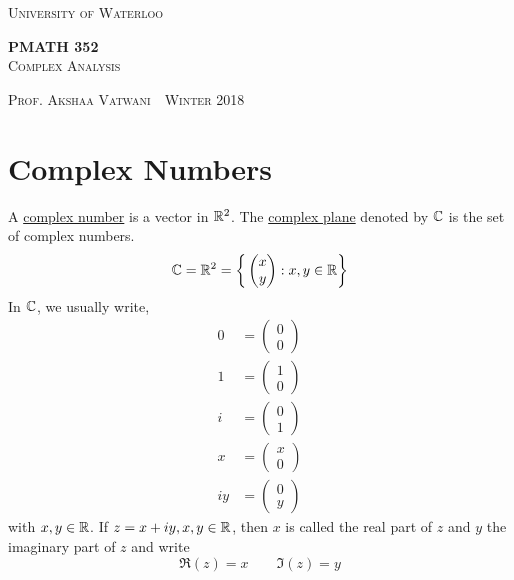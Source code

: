 \documentclass[11pt]{article}
\newcommand{\thiscoursecode}{PMATH 352}
\newcommand{\thiscoursename}{Complex Analysis}
\newcommand{\thisprof}{Prof. Akshaa Vatwani}
\newcommand{\thisterm}{Winter 2018}
\begin{document}
\begin{titlepage}
\begin{centering}
{\scshape\LARGE University of Waterloo \par}
\globe
{\huge\bf \thiscoursecode}\\
{\scshape\Large \thiscoursename}\\
\vspace{.3cm}
{\scshape \thisprof~\textbullet~\thisterm \par}
\end{centering}
\sectionline
\tableofcontents
\sectionline
\thispagestyle{empty}
\end{titlepage}

\section{Complex Numbers}
\begin{definition}
A \underline{complex number} is a vector in $\mathbb{R}^2$. The \underline{complex
plane} denoted by $\mathbb{C}$ is the set of complex numbers. 
\begin{equation*}
\mathbb{C} = \mathbb{R}^2 = \bigg\{\begin{pmatrix}x\\y\end{pmatrix}: x, y \in \mathbb{R} \bigg\}
\end{equation*}
In $\mathbb{C}$, we usually write,
\begin{align*} 
0 &= \begin{pmatrix}0\\0\end{pmatrix}\\
1 &= \begin{pmatrix}1\\0\end{pmatrix}\\
i &= \begin{pmatrix}0\\1\end{pmatrix}\\
x &= \begin{pmatrix}x\\0\end{pmatrix}\\
iy &= \begin{pmatrix}0\\y\end{pmatrix}
\end{align*}
with $x, y \in \mathbb{R}$. If $z = x + iy, x, y \in \mathbb{R}$, then $x$ is called the real
part of $z$ and $y$ the imaginary part of $z$ and write
\begin{equation*}
\Re(z) = x \qquad \Im(z) = y
\end{equation*}
\end{definition}
\end{document}
